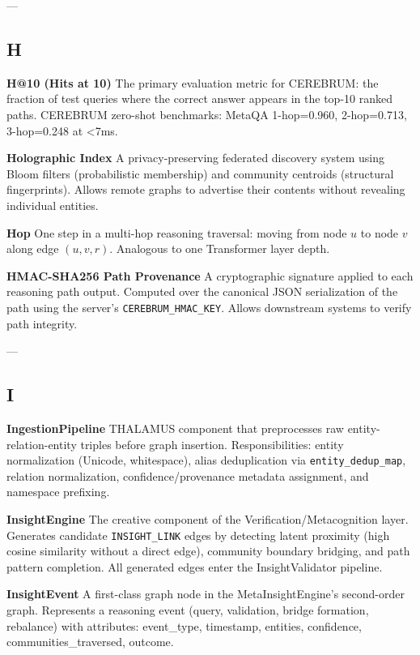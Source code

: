 \documentclass[11pt,article,oneside]{memoir}
\begin{document}
---

\subsection{H}

\textbf{H@10 (Hits at 10)}
The primary evaluation metric for CEREBRUM: the fraction of test queries where the correct answer appears in the top-10 ranked paths. CEREBRUM zero-shot benchmarks: MetaQA 1-hop=0.960, 2-hop=0.713, 3-hop=0.248 at \textless 7ms.

\textbf{Holographic Index}
A privacy-preserving federated discovery system using Bloom filters (proba\-bilistic membership) and community centroids (structural finge\-rprints). Allows remote graphs to advertise their contents without revealing individual entities.

\textbf{Hop}
One step in a multi-hop reasoning traversal: moving from node $u$ to node $v$ along edge $(u, v, r)$. Analogous to one Transformer layer depth.

\textbf{HMAC-SHA256 Path Provenance}
A crypt\-ographic signature applied to each reasoning path output. Computed over the canonical JSON seria\-lization of the path using the server's \texttt{CEREBRUM\_HMAC\_KEY}. Allows downstream systems to verify path integrity.

---

\subsection{I}

\textbf{IngestionPipeline}
THALAMUS component that prepr\-ocesses raw entity-relation-entity triples before graph insertion. Respon\-sibilities: entity norma\-lization (Unicode, whitespace), alias dedup\-lication via \texttt{entity\_dedup\_map}, relation norma\-lization, confidence/provenance metadata assignment, and namespace prefixing.

\textbf{InsightEngine}
The creative component of the Verifi\-cation/Metaco\-gnition layer. Generates candidate \texttt{INSIGHT\_LINK} edges by detecting latent proximity (high cosine similarity without a direct edge), community boundary bridging, and path pattern completion. All generated edges enter the InsightValidator pipeline.

\textbf{InsightEvent}
A first-class graph node in the MetaInsightEngine's second-order graph. Represents a reasoning event (query, validation, bridge formation, rebalance) with attributes: event\_type, timestamp, entities, confidence, communities\_traversed, outcome.
\end{document}
